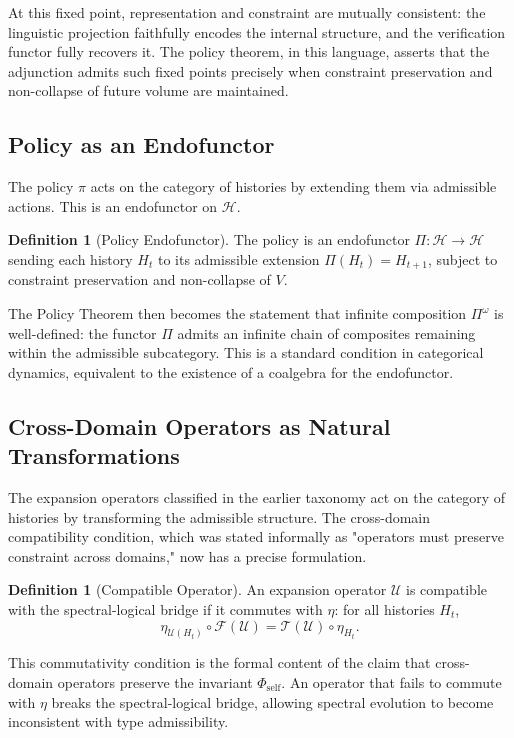 \documentclass[12pt, a4paper]{article}
\theoremstyle{plain}
\theoremstyle{definition}
\newtheorem{definition}[theorem]{Definition}
\theoremstyle{remark}
\begin{document}
At this fixed point, representation and constraint are mutually consistent: the linguistic projection faithfully encodes the internal structure, and the verification functor fully recovers it. The policy theorem, in this language, asserts that the adjunction admits such fixed points precisely when constraint preservation and non-collapse of future volume are maintained.

\subsection{Policy as an Endofunctor}

The policy $\pi$ acts on the category of histories by extending them via admissible actions. This is an endofunctor on $\mathcal{H}$.

\begin{definition}[Policy Endofunctor]
The policy is an endofunctor $\Pi : \mathcal{H} \to \mathcal{H}$ sending each history $H_t$ to its admissible extension $\Pi(H_t) = H_{t+1}$, subject to constraint preservation and non-collapse of $V$.
\end{definition}

The Policy Theorem then becomes the statement that infinite composition $\Pi^\omega$ is well-defined: the functor $\Pi$ admits an infinite chain of composites remaining within the admissible subcategory. This is a standard condition in categorical dynamics, equivalent to the existence of a coalgebra for the endofunctor.

\subsection{Cross-Domain Operators as Natural Transformations}

The expansion operators classified in the earlier taxonomy act on the category of histories by transforming the admissible structure. The cross-domain compatibility condition, which was stated informally as "operators must preserve constraint across domains," now has a precise formulation.

\begin{definition}[Compatible Operator]
An expansion operator $\mathcal{U}$ is compatible with the spectral-logical bridge if it commutes with $\eta$: for all histories $H_t$,
\[
\eta_{\mathcal{U}(H_t)} \circ \mathcal{F}(\mathcal{U}) = \mathcal{T}(\mathcal{U}) \circ \eta_{H_t}.
\]
\end{definition}

This commutativity condition is the formal content of the claim that cross-domain operators preserve the invariant $\Phi_{\mathrm{self}}$. An operator that fails to commute with $\eta$ breaks the spectral-logical bridge, allowing spectral evolution to become inconsistent with type admissibility.
\end{document}
